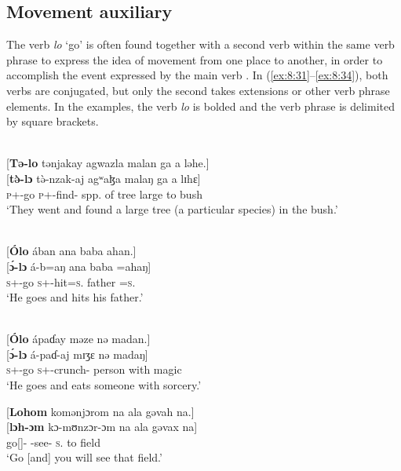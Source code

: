\subsection{Movement auxiliary}\label{sec:8.2.2}
\hypertarget{RefHeading1212581525720847}{}
The verb \textit{lo} ‘go’ is often found together with a second verb within the same verb phrase to express the idea of movement from one place to another, in order to accomplish the event expressed by the main verb \citep{FriesenMamalis2008}. In (\ref{ex:8:31}--\ref{ex:8:34}), both verbs are conjugated, but only the second takes extensions or other verb phrase elements. In the examples, the verb \textit{lo} is bolded and the verb phrase is delimited by square brackets. 

\ea \label{ex:8:31}\\
{}[\textbf{Tə-lo} tənjakay  agwazla  malan  ga  a  ləhe.]\\
\gll  {}[\textbf{t\`{ə}-lɔ}          t\`{ə}-nzak-aj        agʷaɮa      malaŋ   ga      a    lɪhɛ]\\
      \textsc{p}+{\PFV}-go   \textsc{p}+{\PFV}-find{}-{\CL}   {spp. of tree}    large   {\ADJ}  to   bush\\
\glt  ‘They went and found a large tree (a particular species) in the bush.’
\z

\ea \label{ex:8:32}\\\relax
{}[\textbf{\'{O}lo}  ában  ana  baba  ahan.]\\
\gll  {}[\textbf{\'{ɔ}-lɔ}   á-b=aŋ     ana   baba   =ahaŋ]\\
      \textsc{s}+{\IFV}-go  \textsc{s}+{\IFV}-hit=\textsc{s}.{\IO}  {\DAT} father  =\textsc{s}.{\POSS}\\
\glt  ‘He goes and hits his father.’
\z

\ea \label{ex:8:33}\\
{}[\textbf{\'{O}lo}  ápaɗay  məze  nə  madan.]\\
\gll  {}[\textbf{\'{ɔ}-lɔ}   á-paɗ{}-aj     mɪʒɛ   nə   madaŋ]\\
      \textsc{s}+{\IFV}-go  \textsc{s}+{\IFV}-crunch{}-{\CL}  person  with  magic\\
\glt  ‘He goes and eats someone with sorcery.’
\z

\ea \label{ex:8:34}
{}[\textbf{Lohom}  komənjɔrom  na  ala  gəvah  na.]\\
\gll  {}[\textbf{lɔh-ɔm}    kɔ-mʊnzɔr-ɔm   na     ala      gəvax  na]\\
      go[{\IMP}]-{\twoP}   {\twoP}-see-{\twoP}  \textsc{s}.{\DO}  to  field  {\PSP}\\
\glt  ‘Go [and] you will see that field.' 
\z


